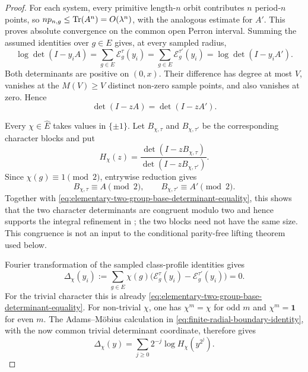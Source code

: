 \begin{proof}
For each system, every primitive length-\(n\) orbit contributes \(n\)
period-\(n\) points, so \(np_{n,g}\le\operatorname{Tr}(A^n)=O(\lambda^n)\), with the
analogous estimate for \(A'\).  This proves absolute convergence on the
common open Perron interval.  Summing the assumed identities over \(g\in E\)
gives, at every sampled radius,
\[
 \log\det(I-y_iA)=\sum_{g\in E}\mathcal E_g^\tau(y_i)
 =\sum_{g\in E}\mathcal E_g^{\tau'}(y_i)
 =\log\det(I-y_iA').
\]
Both determinants are positive on \((0,x)\).  Their difference has degree at
most \(V\), vanishes at the \(M(V)\ge V\) distinct non-zero sample points,
and also vanishes at zero.  Hence
\begin{equation}\label{eq:elementary-two-group-base-determinant-equality}
 \det(I-zA)=\det(I-zA').
\end{equation}

Every \(\chi\in\widehat E\) takes values in \(\{\pm1\}\).  Let
\(B_{\chi,\tau}\) and \(B_{\chi,\tau'}\) be the corresponding character
blocks and put
\[
 H_\chi(z)=\frac{\det(I-zB_{\chi,\tau})}
                  {\det(I-zB_{\chi,\tau'})}.
\]
Since \(\chi(g)\equiv1\pmod2\), entrywise reduction gives
\[
 B_{\chi,\tau}\equiv A\pmod2,
 \qquad B_{\chi,\tau'}\equiv A'\pmod2.
\]
Together with \eqref{eq:elementary-two-group-base-determinant-equality}, this
shows that the two character determinants are congruent modulo two and hence
supports the integral refinement in
; the two blocks need not have the same
size.  This congruence is not an input to the conditional parity-free lifting
theorem  used below.

Fourier transformation of the sampled class-profile identities gives
\[
 \Delta_\chi(y_i):=
 \sum_{g\in E}\chi(g)
 \bigl(\mathcal E_g^\tau(y_i)-\mathcal E_g^{\tau'}(y_i)\bigr)=0.
\]
For the trivial character this is already
\eqref{eq:elementary-two-group-base-determinant-equality}.  For non-trivial
\(\chi\), one has \(\chi^m=\chi\) for odd \(m\) and
\(\chi^m=\mathbf1\) for even \(m\).  The Adams--M\"obius calculation in
\eqref{eq:finite-radial-boundary-identity}, with the now common trivial
determinant coordinate, therefore gives
\[
 \Delta_\chi(y)=\sum_{j\ge0}2^{-j}\log H_\chi(y^{2^j}).
\]


\end{proof}
